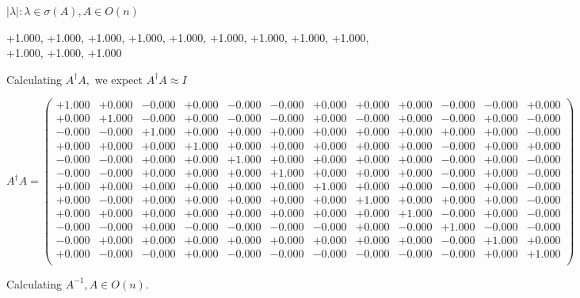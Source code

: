 \documentclass[9pt]{article}
\theoremstyle{plain}
\theoremstyle{definition}
\theoremstyle{remark}
\numberwithin{equation}{section}
\begin{document}
 $|\lambda | : \lambda \in \sigma(A) , A \in O(n)$

+1.000, +1.000, +1.000, +1.000, +1.000, +1.000, +1.000, +1.000, +1.000, +1.000, +1.000, +1.000


Calculating $A^{\dag} A,$  we expect $A^{\dag} A \approx I$

$A^{\dag} A = \left(
\begin{array}{
cccccccccccc}
+1.000 & +0.000 & -0.000 & +0.000 & -0.000 & -0.000 & +0.000 & +0.000 & +0.000 & -0.000 & -0.000 & +0.000 \\
+0.000 & +1.000 & -0.000 & +0.000 & -0.000 & -0.000 & +0.000 & -0.000 & +0.000 & -0.000 & +0.000 & -0.000 \\
-0.000 & -0.000 & +1.000 & +0.000 & +0.000 & +0.000 & +0.000 & +0.000 & +0.000 & +0.000 & +0.000 & -0.000 \\
+0.000 & +0.000 & +0.000 & +1.000 & +0.000 & +0.000 & +0.000 & +0.000 & +0.000 & -0.000 & +0.000 & +0.000 \\
-0.000 & -0.000 & +0.000 & +0.000 & +1.000 & +0.000 & +0.000 & +0.000 & +0.000 & -0.000 & +0.000 & -0.000 \\
-0.000 & -0.000 & +0.000 & +0.000 & +0.000 & +1.000 & +0.000 & +0.000 & +0.000 & -0.000 & +0.000 & -0.000 \\
+0.000 & +0.000 & +0.000 & +0.000 & +0.000 & +0.000 & +1.000 & +0.000 & +0.000 & -0.000 & +0.000 & -0.000 \\
+0.000 & -0.000 & +0.000 & +0.000 & +0.000 & +0.000 & +0.000 & +1.000 & +0.000 & +0.000 & +0.000 & -0.000 \\
+0.000 & +0.000 & +0.000 & +0.000 & +0.000 & +0.000 & +0.000 & +0.000 & +1.000 & -0.000 & +0.000 & -0.000 \\
-0.000 & -0.000 & +0.000 & -0.000 & -0.000 & -0.000 & -0.000 & +0.000 & -0.000 & +1.000 & -0.000 & -0.000 \\
-0.000 & +0.000 & +0.000 & +0.000 & +0.000 & +0.000 & +0.000 & +0.000 & +0.000 & -0.000 & +1.000 & +0.000 \\
+0.000 & -0.000 & -0.000 & +0.000 & -0.000 & -0.000 & -0.000 & -0.000 & -0.000 & -0.000 & +0.000 & +1.000 \\
\end{array}
\right)$ \newline 

Calculating $A^{-1} ,  A \in O(n)$.
\end{document}
